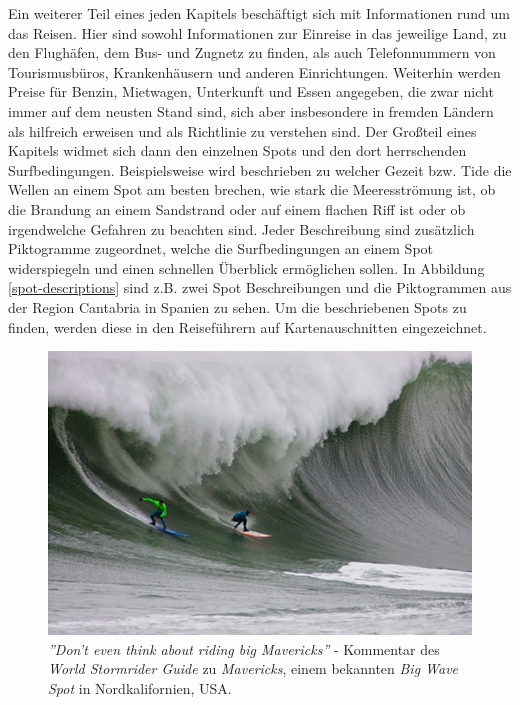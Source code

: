 Ein weiterer Teil eines jeden Kapitels beschäftigt sich mit
Informationen rund um das Reisen. Hier sind sowohl Informationen zur
Einreise in das jeweilige Land, zu den Flughäfen, dem Bus- und Zugnetz
zu finden, als auch Telefonnummern von Tourismusbüros, Krankenhäusern
und anderen Einrichtungen. Weiterhin werden Preise für Benzin,
Mietwagen, Unterkunft und Essen angegeben, die zwar nicht immer auf
dem neusten Stand sind, sich aber insbesondere in fremden Ländern als
hilfreich erweisen und als Richtlinie zu verstehen sind. Der Großteil
eines Kapitels widmet sich dann den einzelnen Spots und den dort
herrschenden Surfbedingungen. Beispielsweise wird beschrieben zu
welcher Gezeit bzw. Tide die Wellen an einem Spot am besten brechen,
wie stark die Meeresströmung ist, ob die Brandung an einem Sandstrand
oder auf einem flachen Riff ist oder ob irgendwelche Gefahren zu
beachten sind. Jeder Beschreibung sind zusätzlich Piktogramme
zugeordnet, welche die Surfbedingungen an einem Spot widerspiegeln und
einen schnellen Überblick ermöglichen sollen. In Abbildung
\ref{spot-descriptions} sind z.B. zwei Spot Beschreibungen und die
Piktogrammen aus der Region Cantabria in Spanien zu sehen. Um die
beschriebenen Spots zu finden, werden diese in den Reiseführern auf
Kartenauschnitten eingezeichnet.

\begin{figure}[h]
  \includegraphics[width=\textwidth]{bilder/mavericks}
  \caption{\textit{''Don't even think about riding big Mavericks''} -
    Kommentar des \textit{World Stormrider Guide} zu
    \textit{Mavericks}, einem bekannten \textit{Big Wave Spot} in
    Nordkalifornien, USA.}
\end{figure}

